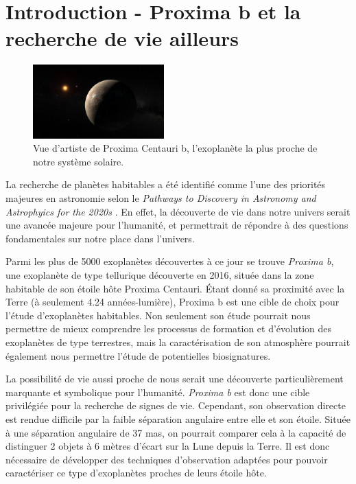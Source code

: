 
\section{\centering Introduction - Proxima b et la recherche de vie ailleurs}
\setlength{\columnsep}{1.3em}%
\begin{figure}
    \includegraphics[width=0.45\textwidth]{figures/art_proxb.jpg}
    \caption{Vue d'artiste de Proxima Centauri b, l'exoplanète la plus proche de notre système solaire.}
\end{figure}

La recherche de planètes habitables a été identifié comme l'une des priorités majeures en astronomie selon le \textsl{Pathways to Discovery in Astronomy and Astrophyics for the 2020s} \cite{NAP26141}. En effet, la découverte de vie dans notre univers serait une avancée majeure pour l'humanité, et permettrait de répondre à des questions fondamentales sur notre place dans l'univers. 

Parmi les plus de 5000 exoplanètes découvertes à ce jour se trouve \textsl{Proxima b}, une exoplanète de type tellurique découverte en 2016, située dans la zone habitable de son étoile hôte Proxima Centauri. Étant donné sa proximité avec la Terre (à seulement 4.24 années-lumière), Proxima b est une cible de choix pour l'étude d'exoplanètes habitables. Non seulement son étude pourrait nous permettre de mieux comprendre les processus de formation et d'évolution des exoplanètes de type terrestres, mais la caractérisation de son atmosphère pourrait également nous permettre l'étude de potentielles biosignatures.

La possibilité de vie aussi proche de nous serait une découverte particulièrement marquante et symbolique pour l'humanité. \textsl{Proxima b} est donc une cible privilégiée pour la recherche de signes de vie. Cependant, son observation directe est rendue difficile par la faible séparation angulaire entre elle et son étoile. Située à une séparation angulaire de 37 mas, on pourrait comparer cela à la capacité de distinguer 2 objets à 6 mètres d'écart sur la Lune depuis la Terre. Il est donc nécessaire de développer des techniques d'observation adaptées pour pouvoir caractériser ce type d'exoplanètes proches de leurs étoile hôte.

